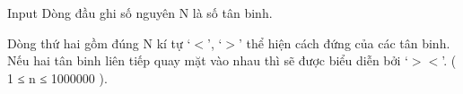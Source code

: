 Input
Dòng đầu ghi số nguyên N là số tân binh.   


   Dòng thứ hai gồm đúng N kí tự ‘$<$’, ‘$>$’ thể hiện cách đứng của các tân binh. Nếu hai tân binh liên tiếp quay mặt vào nhau thì sẽ được biểu diễn bởi ‘$>$$<$’. ( 1 ≤ n ≤ 1000000 ).